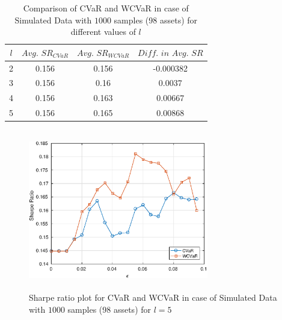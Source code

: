 \begin{table}[!h]
    \centering
    \captionsetup{justification=centering}

   \begin{tabular}{||c|c|c|c||}
   \hline
  
$l$ & $Avg. \, \, SR_{CVaR}$ & $Avg. \, \, SR_{WCVaR}$ & $Diff. \, \, in \, \, Avg. \, \, SR$ \\
  
  \hline
2 & 0.156 & 0.156 & -0.000382 \\
3 & 0.156 & 0.16 & 0.0037 \\
4 & 0.156 & 0.163 & 0.00667 \\
5 & 0.156 & 0.165 & 0.00868 \\
  \hline
\end{tabular}
    \caption{Comparison of CVaR and WCVaR in case of Simulated Data with $1000$ samples (98 assets) for different values of $l$}
    \label{avgtab:6.6}
\end{table}

\begin{figure}[!h]
    \centering
   
    \includegraphics[height=7.0cm,width=0.7\textwidth]{CVaR/bse100_simulated/sr_1000_5.eps}

   \caption{Sharpe ratio plot for CVaR and WCVaR in case of Simulated Data with $1000$ samples (98 assets) for $l=5$}
   \label{fig:6.6}
\end{figure}

